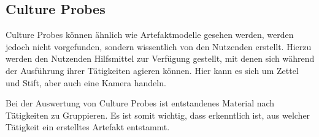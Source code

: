 \subsection{Culture Probes}

Culture Probes können ähnlich wie Artefaktmodelle gesehen werden, werden jedoch nicht vorgefunden, sondern wissentlich von den Nutzenden erstellt.
Hierzu werden den Nutzenden Hilfsmittel zur Verfügung gestellt, mit denen sich während der Ausführung ihrer Tätigkeiten agieren können.
Hier kann es sich um Zettel und Stift, aber auch eine Kamera handeln.

Bei der Auswertung von Culture Probes ist entstandenes Material nach Tätigkeiten zu Gruppieren.
Es ist somit wichtig, dass erkenntlich ist, aus welcher Tätigkeit ein erstelltes Artefakt entstammt.
